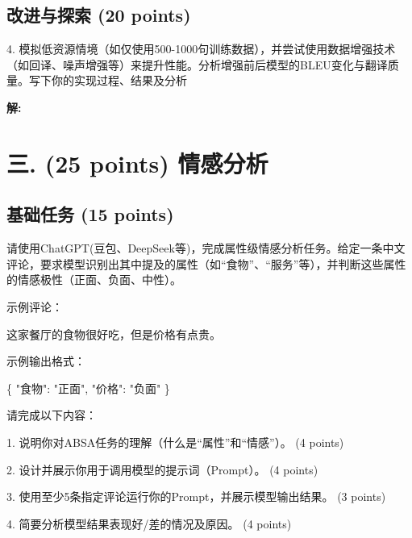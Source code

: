 \documentclass[8pt]{article}
\begin{document}
\subsection*{改进与探索 (20 points)}
4. 模拟低资源情境（如仅使用500-1000句训练数据），并尝试使用数据增强技术（如回译、噪声增强等）来提升性能。分析增强前后模型的BLEU变化与翻译质量。写下你的实现过程、结果及分析

\textbf{\large 解:}
\vspace{8em}
\vspace{8em}
\par






\section*{三. (25 points) 情感分析}
\subsection*{基础任务 (15 points)}
请使用ChatGPT(豆包、DeepSeek等)，完成属性级情感分析任务。给定一条中文评论，要求模型识别出其中提及的属性（如“食物”、“服务”等），并判断这些属性的情感极性（正面、负面、中性）。

示例评论：

这家餐厅的食物很好吃，但是价格有点贵。

示例输出格式：

\{
  "食物": "正面",
  "价格": "负面"
\}

请完成以下内容：

1. 说明你对ABSA任务的理解（什么是“属性”和“情感”）。 (4 points)

2. 设计并展示你用于调用模型的提示词（Prompt）。 (4 points)

3. 使用至少5条指定评论运行你的Prompt，并展示模型输出结果。 (3 points)

4. 简要分析模型结果表现好/差的情况及原因。 (4 points)
\end{document}
